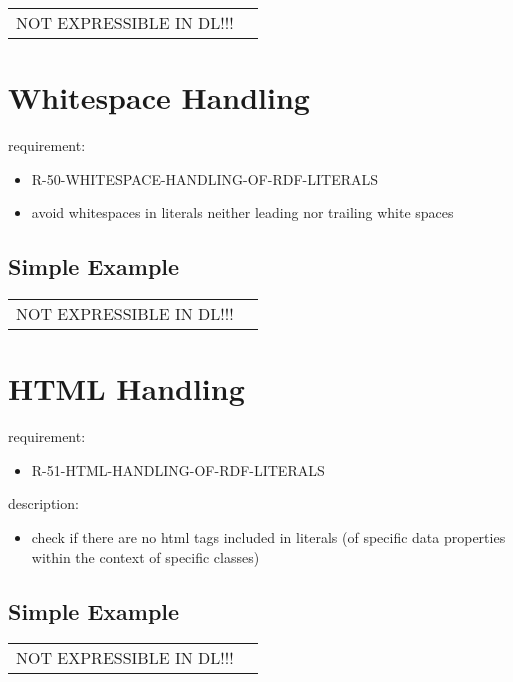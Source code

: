 \documentclass{llncs}
\newenvironment{DL}{
	\begin{center}
  \begin{tabular}{r l}

}{
  \end{tabular}
	\end{center}
}
\begin{document}
\begin{DL}
NOT EXPRESSIBLE IN DL!!!
\end{DL}

\section{Whitespace Handling}

requirement:

\begin{itemize}
	\item R-50-WHITESPACE-HANDLING-OF-RDF-LITERALS
\end{itemize}



\begin{itemize}
	\item avoid whitespaces in literals neither leading nor trailing white spaces
\end{itemize}

\subsection{Simple Example}

\begin{DL}
NOT EXPRESSIBLE IN DL!!!
\end{DL}

\section{HTML Handling}

requirement:

\begin{itemize}
	\item R-51-HTML-HANDLING-OF-RDF-LITERALS
\end{itemize}

description:

\begin{itemize}
	\item check if there are no html tags included in literals (of specific data properties within the context of specific classes)
\end{itemize}

\subsection{Simple Example}

\begin{DL}
NOT EXPRESSIBLE IN DL!!!
\end{DL}
\end{document}

